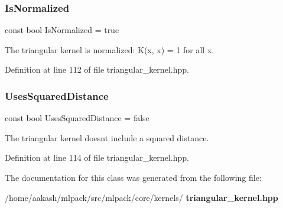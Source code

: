 \subsubsection{Is\+Normalized}
{\footnotesize\ttfamily const bool Is\+Normalized = true\hspace{0.3cm}{\ttfamily [static]}}



The triangular kernel is normalized\+: K(x, x) = 1 for all x. 



Definition at line 112 of file triangular\+\_\+kernel.\+hpp.

\mbox{\label{classmlpack_1_1kernel_1_1KernelTraits_3_01TriangularKernel_01_4_a12fc177e124e69c8efbac5b08e5c5196}} 
\subsubsection{Uses\+Squared\+Distance}
{\footnotesize\ttfamily const bool Uses\+Squared\+Distance = false\hspace{0.3cm}{\ttfamily [static]}}



The triangular kernel doesn\textquotesingle{}t include a squared distance. 



Definition at line 114 of file triangular\+\_\+kernel.\+hpp.



The documentation for this class was generated from the following file\+:\begin{DoxyCompactItemize}
\item 
/home/aakash/mlpack/src/mlpack/core/kernels/\textbf{ triangular\+\_\+kernel.\+hpp}\end{DoxyCompactItemize}
